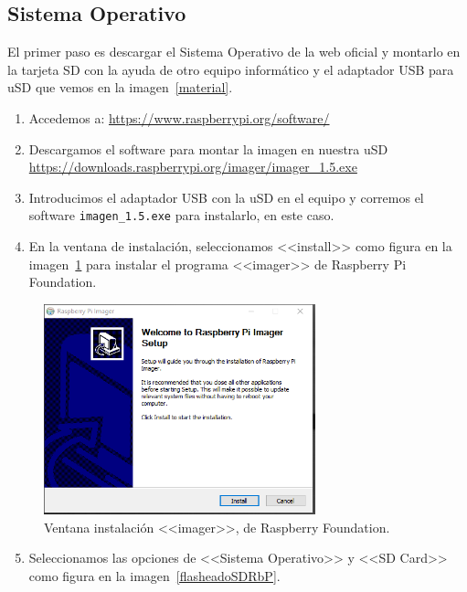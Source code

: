 \subsection{Sistema Operativo}
El primer paso es descargar el Sistema Operativo de la web oficial y montarlo en la tarjeta SD con la ayuda de otro equipo informático y el adaptador USB para uSD que vemos en la imagen~\ref{material}. 

\begin{enumerate}
    \item Accedemos a: \url{https://www.raspberrypi.org/software/}
    \item Descargamos el software para montar la imagen en nuestra uSD \url{https://downloads.raspberrypi.org/imager/imager_1.5.exe}
    \item Introducimos el adaptador USB con la uSD en el equipo y corremos el software \texttt{imagen\_1.5.exe} para instalarlo, en este caso.
    \item En la ventana de instalación, seleccionamos <<install>> como figura en la imagen~\ref{instalacionRaspbian} para instalar el programa <<imager>> de Raspberry Pi Foundation.
\end{enumerate}

\begin{figure}[h]
\centering
\includegraphics[width=0.7\textwidth]{img/fotos/instalacionRaspbian.PNG}
\caption{Ventana instalación <<imager>>, de Raspberry Foundation.}\label{instalacionRaspbian}
\end{figure}

\begin{enumerate}
\setcounter{enumi}{4}
    \item Seleccionamos las opciones de <<Sistema Operativo>> y <<SD Card>> como figura en la imagen~\ref{flasheadoSDRbP}.
\end{enumerate}

